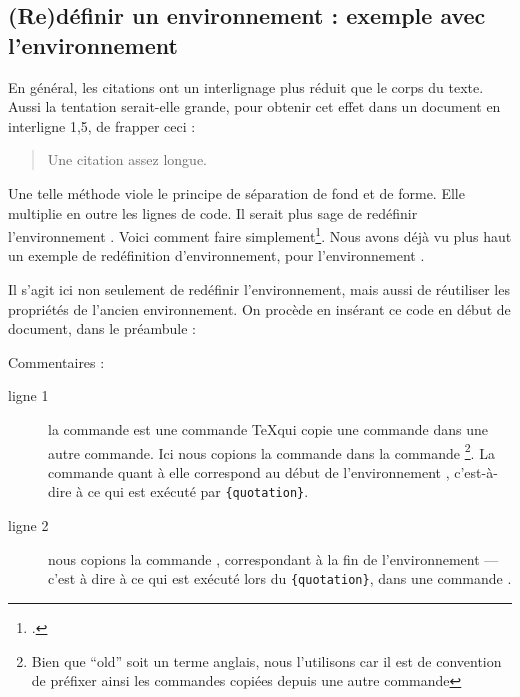 \subsection[Rédéfinir un environnement : quotation]{(Re)définir un environnement : exemple avec l'environnement }

En général, les citations ont un interlignage plus réduit que le corps du texte. Aussi la tentation serait-elle grande, pour obtenir cet effet dans un document en interligne 1,5, de frapper ceci :

\begin{latexcode}
\begin{singlespace}
\begin{quotation}
Une citation assez longue.
\end{quotation}
\end{singlespace}
\end{latexcode}

Une telle méthode viole le principe de séparation de fond et de forme. Elle multiplie en outre les lignes de code. Il serait plus sage de redéfinir l'environnement . Voici comment faire simplement\footcite[Nous nous somme basés sur la classe  :][]{bredele}. Nous avons déjà vu plus haut un exemple de redéfinition d'environnement, pour l'environnement . 

Il s'agit ici non seulement de redéfinir l'environnement, mais aussi de réutiliser les propriétés de l'ancien environnement. On procède en insérant ce code en début de document, dans le préambule :

\begin{latexcode}
\let\oldquotation\quotation
\let\endoldquotation\endquotation
\renewenvironment{quotation}
    {\begin{oldquotation}\singlespace}
        {\end{oldquotation}}
\end{latexcode}

Commentaires : 

\begin{description}
\item[ligne 1] la commande  est une commande \TeX qui copie une commande dans une autre commande. Ici nous copions la commande  dans la commande \footnote{Bien que \enquote{old} soit un terme anglais, nous l'utilisons car il est de convention de préfixer ainsi les commandes copiées depuis une autre commande}. La commande  quant à elle correspond au début de l'environnement , c'est-à-dire à ce qui est exécuté par \verb|{quotation}|.
\item[ligne 2] nous copions la commande , correspondant à la fin de l'environnement   --- c'est à dire à ce qui est exécuté lors du \verb|{quotation}|, dans une commande .
\end{description}

